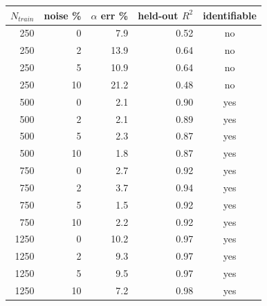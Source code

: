 \begin{tabular}{rrrrc}
\toprule
$N_{train}$ & noise \% & $\alpha$ err \% & held-out $R^2$ & identifiable \\
\midrule
250 & 0 & 7.9 & 0.52 & no \\
250 & 2 & 13.9 & 0.64 & no \\
250 & 5 & 10.9 & 0.64 & no \\
250 & 10 & 21.2 & 0.48 & no \\
500 & 0 & 2.1 & 0.90 & yes \\
500 & 2 & 2.1 & 0.89 & yes \\
500 & 5 & 2.3 & 0.87 & yes \\
500 & 10 & 1.8 & 0.87 & yes \\
750 & 0 & 2.7 & 0.92 & yes \\
750 & 2 & 3.7 & 0.94 & yes \\
750 & 5 & 1.5 & 0.92 & yes \\
750 & 10 & 2.2 & 0.92 & yes \\
1250 & 0 & 10.2 & 0.97 & yes \\
1250 & 2 & 9.3 & 0.97 & yes \\
1250 & 5 & 9.5 & 0.97 & yes \\
1250 & 10 & 7.2 & 0.98 & yes \\
\bottomrule
\end{tabular}
